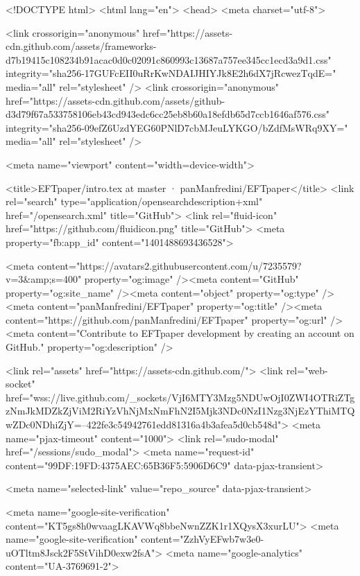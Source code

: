 





<!DOCTYPE html>
<html lang="en">
  <head>
    <meta charset="utf-8">



  <link crossorigin="anonymous" href="https://assets-cdn.github.com/assets/frameworks-d7b19415c108234b91acac0d0c02091c860993c13687a757ee345cc1ecd3a9d1.css" integrity="sha256-17GUFcEII0uRrKwNDAIJHIYJk8E2h6dX7jRcwezTqdE=" media="all" rel="stylesheet" />
  <link crossorigin="anonymous" href="https://assets-cdn.github.com/assets/github-d3d79f67a533758106eb43cd943edc6cc25eb8b60a18efdb65d7ccb1646af576.css" integrity="sha256-09efZ6UzdYEG60PNlD7cbMJeuLYKGO/bZdfMsWRq9XY=" media="all" rel="stylesheet" />
  
  
  
  

  <meta name="viewport" content="width=device-width">
  
  <title>EFTpaper/intro.tex at master · panManfredini/EFTpaper</title>
  <link rel="search" type="application/opensearchdescription+xml" href="/opensearch.xml" title="GitHub">
  <link rel="fluid-icon" href="https://github.com/fluidicon.png" title="GitHub">
  <meta property="fb:app_id" content="1401488693436528">

    
    <meta content="https://avatars2.githubusercontent.com/u/7235579?v=3&amp;s=400" property="og:image" /><meta content="GitHub" property="og:site_name" /><meta content="object" property="og:type" /><meta content="panManfredini/EFTpaper" property="og:title" /><meta content="https://github.com/panManfredini/EFTpaper" property="og:url" /><meta content="Contribute to EFTpaper development by creating an account on GitHub." property="og:description" />

  <link rel="assets" href="https://assets-cdn.github.com/">
  <link rel="web-socket" href="wss://live.github.com/_sockets/VjI6MTY3Mzg5NDUwOjI0ZWI4OTRiZTgzNmJkMDZkZjViM2RiYzVhNjMxNmFhN2I5Mjk3NDc0NzI1Nzg3NjEzYThiMTQwZDc0NDhiZjY=--422fe3c54942761edd81316a4b3afea5d0cb548d">
  <meta name="pjax-timeout" content="1000">
  <link rel="sudo-modal" href="/sessions/sudo_modal">
  <meta name="request-id" content="99DF:19FD:4375AEC:65B36F5:5906D6C9" data-pjax-transient>
  

  <meta name="selected-link" value="repo_source" data-pjax-transient>

  <meta name="google-site-verification" content="KT5gs8h0wvaagLKAVWq8bbeNwnZZK1r1XQysX3xurLU">
<meta name="google-site-verification" content="ZzhVyEFwb7w3e0-uOTltm8Jsck2F5StVihD0exw2fsA">
    <meta name="google-analytics" content="UA-3769691-2">

